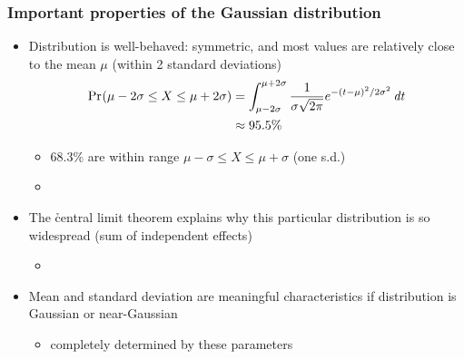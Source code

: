 \documentclass[t]{beamer} %
\begin{document}
\begin{frame}
  \frametitle{Important properties of the Gaussian distribution}

  \begin{itemize}
  \item<1-> Distribution is well-behaved: symmetric, and most values are
    relatively close to the mean $\mu$ (within 2 standard deviations)
    \begin{align*}
      \mathop{\mathrm{Pr}_{}}(\mu-2\sigma\leq X\leq \mu+2\sigma) 
      &= \int_{\mu-2\sigma}^{\mu+2\sigma }
      \frac{1}{\sigma \sqrt{2\pi}} e^{-(t-\mu)^2 / 2\sigma^2} \,\mathit{d{t}}\\
      &\approx 95.5\%
    \end{align*}
    \ungap[1.5]
    \begin{itemize}
    \item 68.3\% are within range $\mu-\sigma\leq X\leq \mu+\sigma$
      (one s.d.)
    \item[]
    \end{itemize}
  \item<2-> The \h{central limit theorem} explains why this particular
    distribution is so widespread (sum of independent effects)
    \begin{itemize}
    \item[]
    \end{itemize}
  \item<3->[\hand] Mean and standard deviation are meaningful characteristics
    if distribution is Gaussian or near-Gaussian
    \begin{itemize}
    \item completely determined by these parameters
    \end{itemize}
  \end{itemize}
\end{frame}
\end{document}
